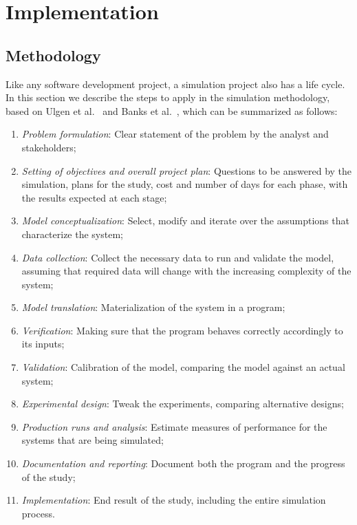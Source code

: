 \chapter{Implementation} \label{chap:implementation}

\section*{}

\section{Methodology} \label{sec:meth}

Like any software development project, a simulation project also has a life 
cycle. In this section we describe the steps to apply in the simulation 
methodology, based on Ulgen et al.~\cite{Ulgen1994} and Banks et 
al.~\cite[section 1.11]{Banks2004}, which can be summarized as follows:

\begin{enumerate}
    \item \textit{Problem formulation}: Clear statement of the problem by the 
    analyst and stakeholders; \label{enum:mform}
    \item \textit{Setting of objectives and overall project plan}: Questions to 
    be answered by the simulation, plans for the study, cost and number of days 
    for each phase, with the results expected at each stage; \label{enum:mobj}
    \item \textit{Model conceptualization}: Select, modify and iterate over the 
    assumptions that characterize the system; \label{enum:mconcept}
    \item \textit{Data collection}: Collect the necessary data to run and 
    validate the model, assuming that required data will change with the 
    increasing complexity of the system; \label{enum:mdata}
    \item \textit{Model translation}: Materialization of the system in a 
    program; \label{enum:mtransl}
    \item \textit{Verification}: Making sure that the program behaves correctly 
    accordingly to its inputs; \label{enum:mverif}
    \item \textit{Validation}: Calibration of the model, comparing the model 
    against an actual system; \label{enum:mvalid}
    \item \textit{Experimental design}: Tweak the experiments, comparing 
    alternative designs; \label{enum:mexp}
    \item \textit{Production runs and analysis}: Estimate measures of 
    performance for the systems that are being simulated; \label{enum:mprod}
    \item \textit{Documentation and reporting}: Document both the program and 
    the progress of the study; \label{enum:mdocs}
    \item \textit{Implementation}: End result of the study, including the 
    entire simulation process. \label{enum:mimpl}
\end{enumerate}

